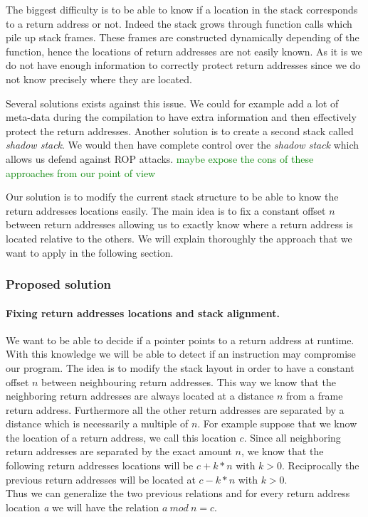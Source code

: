 \documentclass[11pt]{sdm}
\begin{document}
The biggest difficulty is to be able to know if a location in the stack corresponds to a return address or not. Indeed the stack grows through function calls which pile up stack frames. 
These frames are constructed dynamically depending of the function, hence the locations of return addresses are not easily known.
As it is we do not have enough information to correctly protect return addresses since we do not know precisely where they are located.

Several solutions exists against this issue. We could for example add a lot of meta-data during the compilation to have extra information and then effectively protect the return addresses. Another solution is to create a second stack called \textit{shadow stack}. We would then have complete control over the \textit{shadow stack} which allows us defend against ROP attacks.
\textcolor{green}{maybe expose the cons of these approaches from our point of view}

Our solution is to modify the current stack structure to be able to know the return addresses locations easily. The main idea is to fix a constant offset $n$ between return addresses allowing us to exactly know where a return address is located relative to the others. We will explain thoroughly the approach that we want to apply in the following section.

\subsubsection{Proposed solution}

\paragraph{Fixing return addresses locations and stack alignment.}
\label{par:Fixing return addresses locations}

We want to be able to decide if a pointer points to a return address at runtime. With this knowledge we will be able to detect if an instruction may compromise our program.
The idea is to modify the stack layout in order to have a constant offset $n$ between neighbouring return addresses. This way we know that the neighboring return addresses are always located at a distance $n$ from a frame return address. Furthermore all the other return addresses are separated by a distance which is necessarily a multiple of $n$.
For example suppose that we know the location of a return address, we call this location $c$.
Since all neighboring return addresses are separated by the exact amount $n$, we know that the following return addresses locations will be $c+k*n$ with $k>0$. Reciprocally the previous return addresses will be located at $c-k*n$ with $k>0$.\\
Thus we can generalize the two previous relations and for every return address location \textit{a} we will have the relation $a~mod~n = c$.
\end{document}
